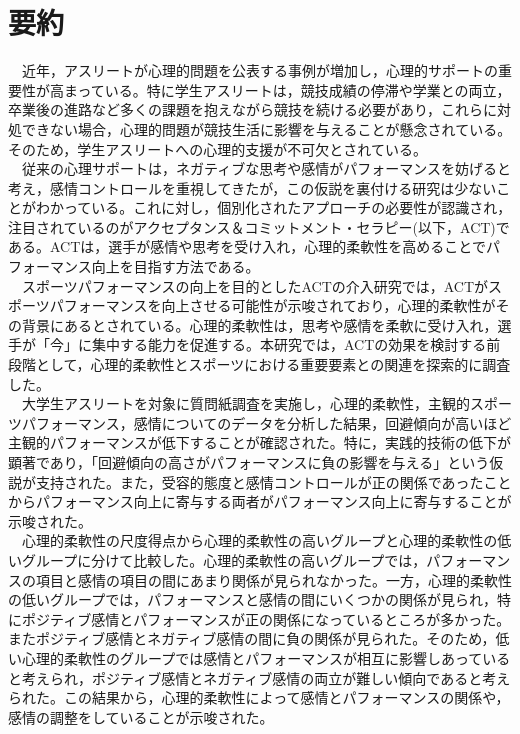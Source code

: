 \documentclass[12pt,a4paper,xelatex,ja=standard]{bxjsarticle}
\begin{document}
\clearpage

\hypertarget{ux8981ux7d04}{%
\section{要約}\label{ux8981ux7d04}}

　近年，アスリートが心理的問題を公表する事例が増加し，心理的サポートの重要性が高まっている。特に学生アスリートは，競技成績の停滞や学業との両立，卒業後の進路など多くの課題を抱えながら競技を続ける必要があり，これらに対処できない場合，心理的問題が競技生活に影響を与えることが懸念されている。そのため，学生アスリートへの心理的支援が不可欠とされている。\\
　従来の心理サポートは，ネガティブな思考や感情がパフォーマンスを妨げると考え，感情コントロールを重視してきたが，この仮説を裏付ける研究は少ないことがわかっている。これに対し，個別化されたアプローチの必要性が認識され，注目されているのがアクセプタンス＆コミットメント・セラピー(以下，ACT)である。ACTは，選手が感情や思考を受け入れ，心理的柔軟性を高めることでパフォーマンス向上を目指す方法である。\\
　スポーツパフォーマンスの向上を目的としたACTの介入研究では，ACTがスポーツパフォーマンスを向上させる可能性が示唆されており，心理的柔軟性がその背景にあるとされている。心理的柔軟性は，思考や感情を柔軟に受け入れ，選手が「今」に集中する能力を促進する。本研究では，ACTの効果を検討する前段階として，心理的柔軟性とスポーツにおける重要要素との関連を探索的に調査した。\\
　大学生アスリートを対象に質問紙調査を実施し，心理的柔軟性，主観的スポーツパフォーマンス，感情についてのデータを分析した結果，回避傾向が高いほど主観的パフォーマンスが低下することが確認された。特に，実践的技術の低下が顕著であり，「回避傾向の高さがパフォーマンスに負の影響を与える」という仮説が支持された。また，受容的態度と感情コントロールが正の関係であったことからパフォーマンス向上に寄与する両者がパフォーマンス向上に寄与することが示唆された。\\
　心理的柔軟性の尺度得点から心理的柔軟性の高いグループと心理的柔軟性の低いグループに分けて比較した。心理的柔軟性の高いグループでは，パフォーマンスの項目と感情の項目の間にあまり関係が見られなかった。一方，心理的柔軟性の低いグループでは，パフォーマンスと感情の間にいくつかの関係が見られ，特にポジティブ感情とパフォーマンスが正の関係になっているところが多かった。またポジティブ感情とネガティブ感情の間に負の関係が見られた。そのため，低い心理的柔軟性のグループでは感情とパフォーマンスが相互に影響しあっていると考えられ，ポジティブ感情とネガティブ感情の両立が難しい傾向であると考えられた。この結果から，心理的柔軟性によって感情とパフォーマンスの関係や，感情の調整をしていることが示唆された。\\
\end{document}
